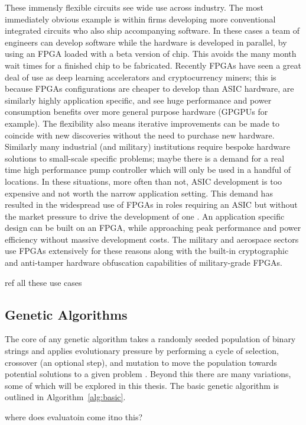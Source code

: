 These immensly flexible circuits see wide use across industry. The most immediately
obvious example is
within firms developing more conventional integrated circuits who also ship accompanying
software. In these cases a team of engineers can develop software
while the hardware is developed in parallel, by using an FPGA loaded with a beta version
of chip. This avoids the many month wait times for a finished chip to be fabricated.
Recently FPGAs have seen a great deal of use as deep learning accelerators and cryptocurrency
miners; this is because FPGAs
configurations are cheaper to develop than ASIC hardware, are similarly highly application specific,
and see huge performance and power consumption benefits over more general purpose
hardware (GPGPUs for example). The flexibility also means iterative improvements
can be made to coincide with new discoveries without the need to purchase new
hardware. Similarly many industrial (and military) institutions require
bespoke hardware solutions to small-scale specific problems; maybe there is a
demand for a real time high performance
pump controller which will only be used in a handful of locations. In these situations,
more often than not, ASIC
development is too expensive and not worth the narrow application setting. This demand has resulted in
the widespread use of FPGAs
in roles requiring an ASIC but without the market pressure to drive the development
of one \cite{4267891}.
An application specific design can be built on an FPGA, while approaching peak performance and power
efficiency without massive development costs.
The military and aerospace sectors use FPGAs extensively for these reasons along with
the built-in cryptographic and anti-tamper hardware obfuscation capabilities of
military-grade FPGAs.

\todo ref all these use cases

\subsection{Genetic Algorithms}
The core of any genetic algorithm takes a randomly seeded population of binary strings
and applies
evolutionary pressure by performing a cycle of selection, crossover (an optional
step), and mutation
to move the population towards potential solutions to a given problem \cite{Goldberg:1989:GAS:534133}.
Beyond this there are many
variations, some of which will be explored in this thesis. The basic genetic algorithm is
outlined in Algorithm~\ref{alg:basic}.

\todo where does evaluatoin come itno this?

